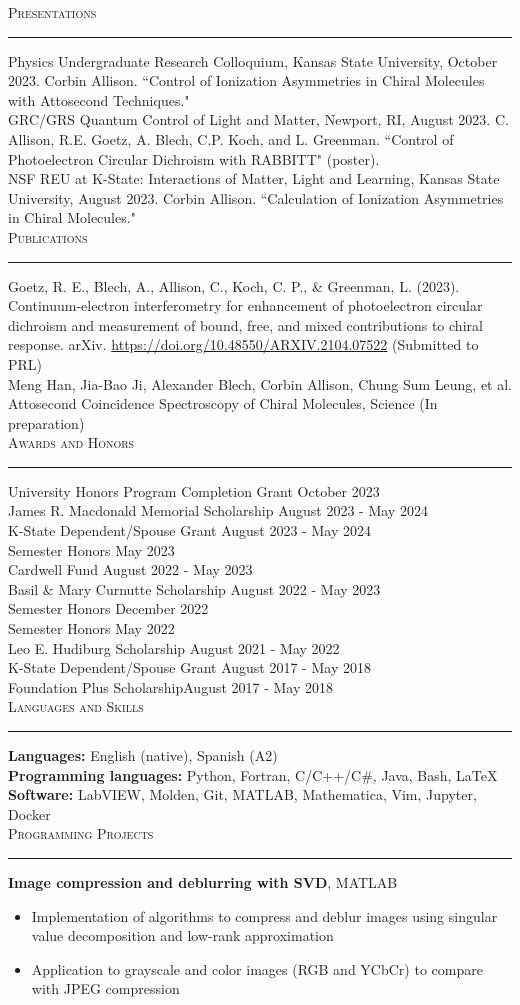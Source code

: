 \documentclass{article}
\newcommand{\return}{\\[6pt]}
\newcommand{\sect}[1]{
\noindent\large{\textsc{#1}}\\[-6pt]\normalsize{\noindent\rule{\textwidth}{0.5pt}}
}
\begin{document}
\sect{Presentations}
Physics Undergraduate Research Colloquium, Kansas State University, October 2023. Corbin Allison. ``Control of Ionization Asymmetries in Chiral Molecules with Attosecond Techniques." \return
GRC/GRS Quantum Control of Light and Matter, Newport, RI, August 2023. C. Allison, R.E. Goetz, A. Blech, C.P. Koch, and L. Greenman. ``Control of Photoelectron Circular Dichroism with RABBITT" (poster). \return
NSF REU at K-State: Interactions of Matter, Light and Learning, Kansas State University, August 2023. Corbin Allison. ``Calculation of Ionization Asymmetries in Chiral Molecules."\return
\sect{Publications}
Goetz, R. E., Blech, A., Allison, C., Koch, C. P., \& Greenman, L. (2023). Continuum-electron interferometry for enhancement of photoelectron circular dichroism and measurement of bound, free, and mixed contributions to chiral response. arXiv.  \url{https://doi.org/10.48550/ARXIV.2104.07522} (Submitted to PRL)\return
Meng Han, Jia-Bao Ji, Alexander Blech, Corbin Allison, Chung Sum Leung, et al. Attosecond Coincidence Spectroscopy of Chiral Molecules, Science (In preparation) \return
\sect{Awards and Honors}
University Honors Program Completion Grant \hfill October 2023 \return
James R. Macdonald Memorial Scholarship \hfill August 2023 - May 2024 \return
K-State Dependent/Spouse Grant \hfill August 2023 - May 2024 \return
Semester Honors \hfill May 2023 \return
Cardwell Fund \hfill August 2022 - May 2023 \return
Basil \& Mary Curnutte Scholarship \hfill August 2022 - May 2023 \return
Semester Honors \hfill December 2022 \return
Semester Honors \hfill May 2022 \return
Leo E. Hudiburg Scholarship \hfill August 2021 - May 2022 \return
K-State Dependent/Spouse Grant \hfill August 2017 - May 2018 \return
Foundation Plus Scholarship\hfill August 2017 - May 2018 \return
\sect{Languages and Skills}
\textbf{Languages:} English (native), Spanish (A2) \return
\textbf{Programming languages:} Python, Fortran, C/C++/C\#, Java, Bash, \LaTeX \return
\textbf{Software:} LabVIEW, Molden, Git, MATLAB, Mathematica, Vim, Jupyter, Docker \return
\sect{Programming Projects}
\textbf{Image compression and deblurring with SVD}, MATLAB 
\begin{itemize}
	\item Implementation of algorithms to compress and deblur images using singular value decomposition and low-rank approximation
	\item Application to grayscale and color images (RGB and YCbCr) to compare with JPEG compression
\end{itemize} 
\end{document}
